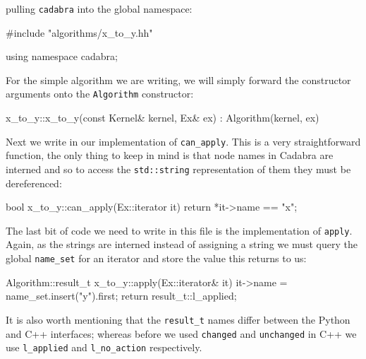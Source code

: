 \documentclass{article}
\begin{document}
pulling \verb|cadabra| into the global namespace:
\begin{lstcpp}
	#include "algorithms/x_to_y.hh"
	
	using namespace cadabra;
\end{lstcpp}
For the simple algorithm we are writing, we will simply forward the constructor arguments onto the \verb|Algorithm| constructor:
\begin{lstcpp}
	x_to_y::x_to_y(const Kernel& kernel, Ex& ex)
		: Algorithm(kernel, ex)
		{
	
		}
\end{lstcpp}
Next we write in our implementation of \verb|can_apply|. This is a very straightforward function, the only thing to keep in 
mind is that node names in Cadabra are interned and so to access the \verb|std::string| representation of them they must
be dereferenced:
\begin{lstcpp}
	bool x_to_y::can_apply(Ex::iterator it)
		{
		return *it->name == "x";
		}
\end{lstcpp}
The last bit of code we need to write in this file is the implementation of \verb|apply|. Again, as the strings are interned
instead of assigning a string we must query the global \verb|name_set| for an iterator and store the value this returns to us:
\begin{lstcpp}
	Algorithm::result_t x_to_y::apply(Ex::iterator& it)
		{
		it->name = name_set.insert("y").first;
		return result_t::l_applied;
		}
\end{lstcpp}
It is also worth mentioning that the \verb|result_t| names differ between the Python and C++ interfaces; whereas before we
used \verb|changed| and \verb|unchanged| in C++ we use \verb|l_applied| and \verb|l_no_action| respectively.
\end{document}
